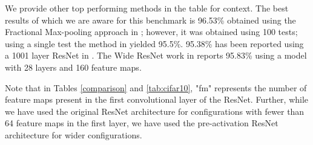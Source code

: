 \documentclass{article}
\begin{document}
We provide other top performing methods in the table for context. The best results of which we are aware for this benchmark is 96.53\% obtained using the Fractional Max-pooling approach in \cite{graham2014fractional}; however, it was obtained using 100 tests; using a single test the method in \cite{graham2014fractional} yielded 95.5\%. 95.38\% has been reported using a 1001 layer ResNet in \cite{he2016identity}. The Wide ResNet work in \cite{zagoruyko2016wide} reports 95.83\% using a model with 28 layers and 160 feature maps.

Note that in Tables \ref{comparison} and \ref{tab:cifar10}, "fm" represents the number of feature maps present in the first convolutional layer of the ResNet. Further, while we have used the original ResNet architecture \cite{he2015deep} for configurations with fewer than 64 feature maps in the first layer, we have used the pre-activation ResNet architecture \cite{he2016identity} for wider configurations.
\end{document}
